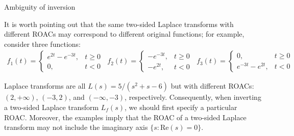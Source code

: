 \documentclass{beamer}
\begin{document}
\begin{frame}{Ambiguity of inversion}


    {\footnotesize \footnotesize
    It is worth pointing out that the same 
    two-sided Laplace transforms with different ROACs may correspond to different original functions; for example, consider three functions:
    \vspace{1em}
    \begin{align*}
        f_1(t) =
        \begin{cases} 
        e^{2t} - e^{-3t}, & t \geq 0\\
        0, & t < 0
        \end{cases}\;\;f_2(t) =
        \begin{cases} 
        -e^{-3t}, & t \geq 0\\
        -e^{2t}, & t < 0
        \end{cases}\;\;f_3(t) =
        \begin{cases} 
        0, & t \geq 0\\
        e^{-3t} - e^{2t}, & t < 0
        \end{cases}
    \end{align*}
    \vspace{1em}
    \par \pause  Laplace transforms are all \( L(s) = 5/(s^2 + s - 6) \) 
    but with different ROACs: \((2, +\infty)\), \((-3, 2)\), and \((-\infty, -3)\), respectively. 
    Consequently, when inverting a two-sided Laplace transform \( L_f(s) \), we should first specify a particular ROAC.  Moreover, the examples 
    imply that the ROAC of a two-sided Laplace transform may not include the imaginary axis \(\{s : \text{Re}(s) = 0\}\).
    \vspace{1em}
    }
    
\end{frame}
\end{document}
